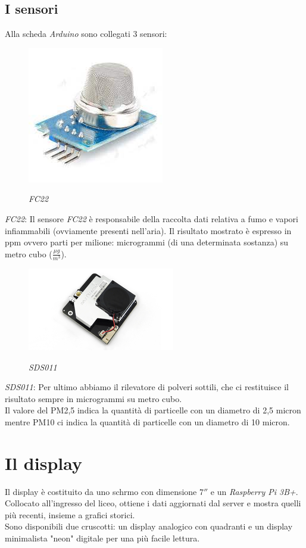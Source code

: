 \documentclass{article}
\begin{document}
\subsection{I sensori}
Alla scheda \emph{Arduino} sono collegati 3 sensori:
\begin{figure}[h!]
\centering
\includegraphics[]{FC22.png}\\
\caption{\emph{FC22}}
\end{figure}
\emph{FC22}: Il sensore \emph{FC22} è responsabile della raccolta dati relativa a fumo e vapori infiammabili (ovviamente presenti nell’aria). Il risultato mostrato è espresso in ppm ovvero parti per milione: microgrammi (di una determinata sostanza) su metro cubo ($\frac{\mu g}{m^3}$).
\begin{figure}[h!]
\centering
\includegraphics[]{sds011.jpg}\\
\caption{\emph{SDS011}}
\end{figure}
\emph{SDS011}: Per ultimo abbiamo il rilevatore di polveri sottili, che ci restituisce il risultato sempre in microgrammi su metro cubo.\\
Il valore del PM2,5 indica la quantità di particelle con un diametro di 2,5 micron mentre PM10 ci indica la quantità di particelle con un diametro di 10 micron.
\section{Il display}
Il display è costituito da uno schrmo con dimensione $7''$ e un \emph{Raspberry Pi 3B+}.
Collocato all'ingresso del liceo, ottiene i dati aggiornati dal server e mostra quelli più recenti, insieme a grafici storici.\\
Sono disponibili due cruscotti: un display analogico con quadranti e un display minimalista "neon" digitale per una più facile lettura.
\end{document}
